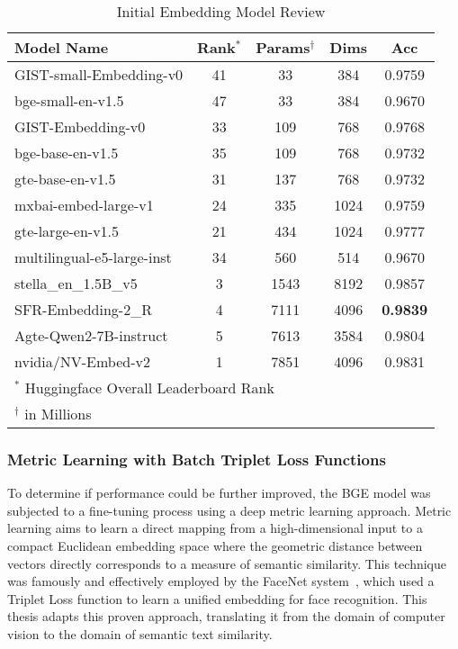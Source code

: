 \begin{table}[!tb]
    \captionsetup{skip=5pt}
    \centering
    \caption{Initial Embedding Model Review}
    \label{tbl:emb_models}
    \begin{tabular}{lcccc}
        \toprule
        Model Name                 & Rank$^{*}$ & Params$^{\dagger}$ & Dims & Acc             \\
        \midrule
        GIST-small-Embedding-v0    & 41         & 33                 & 384  & 0.9759          \\
        bge-small-en-v1.5          & 47         & 33                 & 384  & 0.9670          \\
        GIST-Embedding-v0          & 33         & 109                & 768  & 0.9768          \\
        bge-base-en-v1.5           & 35         & 109                & 768  & 0.9732          \\
        gte-base-en-v1.5           & 31         & 137                & 768  & 0.9732          \\
        mxbai-embed-large-v1       & 24         & 335                & 1024 & 0.9759          \\
        gte-large-en-v1.5          & 21         & 434                & 1024 & 0.9777          \\
        multilingual-e5-large-inst & 34         & 560                & 514  & 0.9670          \\
        stella\_en\_1.5B\_v5       & 3          & 1543               & 8192 & 0.9857          \\
        SFR-Embedding-2\_R         & 4          & 7111               & 4096 & \textbf{0.9839} \\
        Agte-Qwen2-7B-instruct     & 5          & 7613               & 3584 & 0.9804          \\
        nvidia/NV-Embed-v2         & 1          & 7851               & 4096 & 0.9831          \\
        \bottomrule
        \multicolumn{4}{p{6cm}}{\scriptsize $^{*}$ Huggingface Overall Leaderboard Rank} \\
        \multicolumn{4}{p{6cm}}{\scriptsize $^{\dagger}$ in Millions}
    \end{tabular}
\end{table}

\subsubsection{Metric Learning with Batch Triplet Loss Functions}\label{ch:3.3.1.2}
To determine if performance could be further improved, the BGE model was subjected to a fine-tuning process using a deep metric learning approach. Metric learning aims to learn a direct mapping from a high-dimensional input to a compact Euclidean embedding space where the geometric distance between vectors directly corresponds to a measure of semantic similarity. This technique was famously and effectively employed by the FaceNet system~\cite{Schroff_2015}, which used a Triplet Loss function to learn a unified embedding for face recognition. This thesis adapts this proven approach, translating it from the domain of computer vision to the domain of semantic text similarity.

